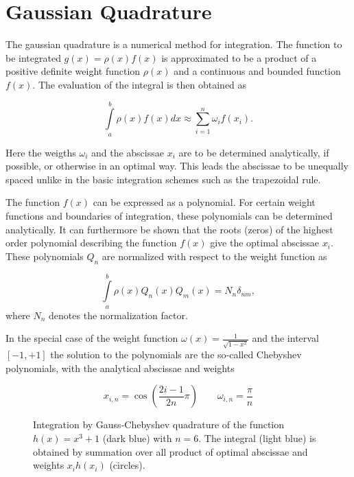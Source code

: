 \section{Gaussian Quadrature}
The gaussian quadrature is a numerical method for integration.
The function to be integrated $g(x) = \rho(x) f(x)$ is approximated
to be a product of a positive definite weight
function $\rho (x)$ and a continuous and bounded function $f(x)$. \cite{Wikipedia_Gauss_Quadratur}
The evaluation of the integral is then obtained as

\begin{equation}
  \int\limits_a^b \rho(x) f(x) dx \approx \sum\limits_{i=1}^n \omega_i f(x_i)  .
\end{equation}

Here the weigths $\omega_i$ and the abscissae $x_i$ are to be determined
analytically, if possible, or otherwise in an optimal way. This leads the abscissae
to be unequally spaced unlike in the basic
integration schemes such as the trapezoidal rule.

The function $f(x)$ can be expressed as a polynomial.
For certain weight functions and boundaries
of integration, these
polynomials can be determined analytically.
It can furthermore be shown that the roots (zeros) of the highest order polynomial
describing the function $f(x)$ give the optimal abscissae $x_i$.
These polynomials $Q_n$ are normalized with respect to the weight function as

\begin{equation}
  \int\limits_{a}^{b} \rho(x) Q_n(x) Q_m(x) = N_n \delta_{nm}  ,
\end{equation}
where $N_n$ denotes the normalization factor.


In the special case of the weight function
$\omega(x)= \frac{1}{\sqrt{1-x^2}}$ and the interval $[-1,+1]$
the solution to the polynomials are the so-called Chebyshev polynomials, with
the analytical abscissae and weights

\begin{equation}
  x_{i,n} = \cos \left( \frac{2i-1}{2n} \pi \right)
  \quad\quad \omega_{i,n} = \frac \pi n 
\end{equation}

\begin{figure}[ht]
  \centering
  
  \caption{Integration by Gauss-Chebyshev quadrature of the function
           $h(x)=x^3 + 1$ (dark blue) with $n=6$. The integral (light blue)
           is obtained by summation
           over all product of optimal abscissae and weights $x_ih(x_i)$ (circles).}
  \label{figure:gaussian_quadrature}
\end{figure}

